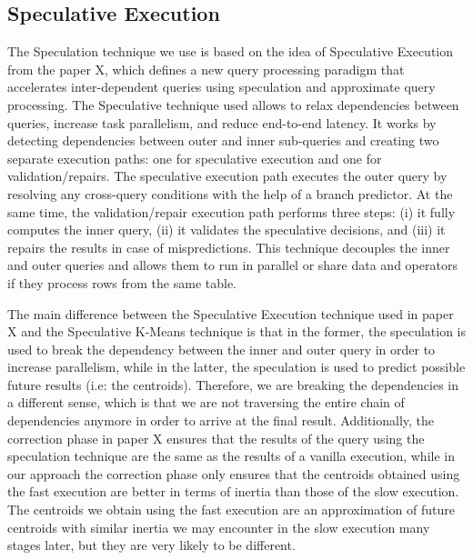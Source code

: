 \subsection{Speculative Execution}
The Speculation technique we use is based on the idea of Speculative Execution from the paper X, which defines a new query processing paradigm that accelerates inter-dependent queries using speculation and approximate query processing. The Speculative technique used allows to relax dependencies between queries, increase task parallelism, and reduce end-to-end latency. It works by detecting dependencies between outer and inner sub-queries and creating two separate execution paths: one for speculative execution and one for validation/repairs. The speculative execution path executes the outer query by resolving any cross-query conditions with the help of a branch predictor. At the same time, the validation/repair execution path performs three steps: (i) it fully computes the inner query, (ii) it validates the speculative decisions, and (iii) it repairs the results in case of mispredictions. This technique decouples the inner and outer queries and allows them to run in parallel or share data and operators if they process rows from the same table.

The main difference between the Speculative Execution technique used in paper X and the Speculative K-Means technique is that in the former, the speculation is used to break the dependency between the inner and outer query in order to increase parallelism, while in the latter, the speculation is used to predict possible future results (i.e: the centroids). Therefore, we are breaking the dependencies in a different sense, which is that we are not traversing the entire chain of dependencies anymore in order to arrive at the final result. Additionally, the correction phase in paper X ensures that the results of the query using the speculation technique are the same as the results of a vanilla execution, while in our approach the correction phase only ensures that the centroids obtained using the fast execution are better in terms of inertia than those of the slow execution. The centroids we obtain using the fast execution are an approximation of future centroids with similar inertia we may encounter in the slow execution many stages later, but they are very likely to be different.

